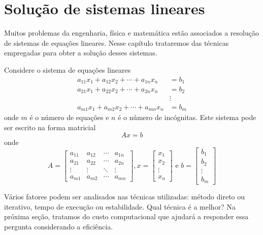 
%

\chapter{Solução de sistemas lineares}

Muitos problemas da engenharia, física e matemática estão associados a resolução de sistemas de equações lineares. Nesse capítulo trataremos das técnicas empregadas para obter a solução desses sistemas. 


Considere o sistema de equações lineares
\begin{align*}
a_{11}x_1 + a_{12}x_2 + \cdots +a_{1n}x_n &= b_1\\
a_{21}x_1 + a_{22}x_2 + \cdots +a_{2n}x_n &= b_2\\
                                          &\vdots \\
a_{m1}x_1 + a_{m2}x_2 + \cdots +a_{mn}x_n &= b_m
\end{align*}
onde $m$ é o número de equações e $n$ é o número de incógnitas.  Este sistema pode ser escrito na forma matricial
$$Ax=b$$
onde
$$A=\begin{bmatrix}
a_{11} & a_{12} & \cdots & a_{1n}\\
a_{21} & a_{22} & \cdots & a_{2n}\\
\vdots & \vdots & \ddots & \vdots\\
a_{m1} & a_{m2} & \cdots & a_{mn}
\end{bmatrix},
x=\begin{bmatrix}
x_{1} \\
x_{2} \\
\vdots \\
x_{n}
\end{bmatrix}
 \text{ e } b=\begin{bmatrix}
b_{1} \\
b_{2} \\
\vdots \\
b_{m}
\end{bmatrix}
$$

Vários fatores podem ser analisados nas técnicas utilizadas: método direto ou iterativo, tempo de execução ou estabilidade. Qual técnica é a melhor? Na próxima seção, tratamos do custo computacional que ajudará a responder essa pergunta considerando a eficiência.


